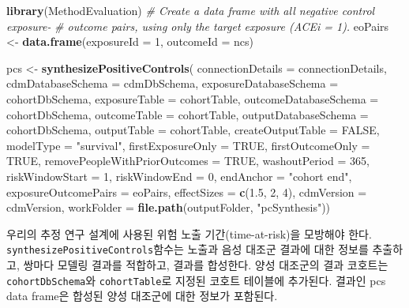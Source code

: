 \documentclass[10.5pt]{book}
\newenvironment{Shaded}{\begin{snugshade}}{\end{snugshade}}
\newcommand{\KeywordTok}[1]{\textcolor[rgb]{0.13,0.29,0.53}{\textbf{#1}}}
\newcommand{\DataTypeTok}[1]{\textcolor[rgb]{0.13,0.29,0.53}{#1}}
\newcommand{\DecValTok}[1]{\textcolor[rgb]{0.00,0.00,0.81}{#1}}
\newcommand{\FloatTok}[1]{\textcolor[rgb]{0.00,0.00,0.81}{#1}}
\newcommand{\StringTok}[1]{\textcolor[rgb]{0.31,0.60,0.02}{#1}}
\newcommand{\CommentTok}[1]{\textcolor[rgb]{0.56,0.35,0.01}{\textit{#1}}}
\newcommand{\OtherTok}[1]{\textcolor[rgb]{0.56,0.35,0.01}{#1}}
\newcommand{\NormalTok}[1]{#1}
\theoremstyle{definition}
\theoremstyle{definition}
\theoremstyle{definition}
\theoremstyle{remark}
\begin{document}
\begin{Shaded}
\begin{Highlighting}[]
\KeywordTok{library}\NormalTok{(MethodEvaluation)}
\CommentTok{# Create a data frame with all negative control exposure-}
\CommentTok{# outcome pairs, using only the target exposure (ACEi = 1).}
\NormalTok{eoPairs <-}\StringTok{ }\KeywordTok{data.frame}\NormalTok{(}\DataTypeTok{exposureId =} \DecValTok{1}\NormalTok{,}
                      \DataTypeTok{outcomeId =}\NormalTok{ ncs)}

\NormalTok{pcs <-}\StringTok{ }\KeywordTok{synthesizePositiveControls}\NormalTok{(}
  \DataTypeTok{connectionDetails =}\NormalTok{ connectionDetails,}
  \DataTypeTok{cdmDatabaseSchema =}\NormalTok{ cdmDbSchema,}
  \DataTypeTok{exposureDatabaseSchema =}\NormalTok{ cohortDbSchema,}
  \DataTypeTok{exposureTable =}\NormalTok{ cohortTable,}
  \DataTypeTok{outcomeDatabaseSchema =}\NormalTok{ cohortDbSchema,}
  \DataTypeTok{outcomeTable =}\NormalTok{ cohortTable,}
  \DataTypeTok{outputDatabaseSchema =}\NormalTok{ cohortDbSchema,}
  \DataTypeTok{outputTable =}\NormalTok{ cohortTable,}
  \DataTypeTok{createOutputTable =} \OtherTok{FALSE}\NormalTok{,}
  \DataTypeTok{modelType =} \StringTok{"survival"}\NormalTok{,}
  \DataTypeTok{firstExposureOnly =} \OtherTok{TRUE}\NormalTok{,}
  \DataTypeTok{firstOutcomeOnly =} \OtherTok{TRUE}\NormalTok{,}
  \DataTypeTok{removePeopleWithPriorOutcomes =} \OtherTok{TRUE}\NormalTok{,}
  \DataTypeTok{washoutPeriod =} \DecValTok{365}\NormalTok{,}
  \DataTypeTok{riskWindowStart =} \DecValTok{1}\NormalTok{,}
  \DataTypeTok{riskWindowEnd =} \DecValTok{0}\NormalTok{,}
  \DataTypeTok{endAnchor =} \StringTok{"cohort end"}\NormalTok{,}
  \DataTypeTok{exposureOutcomePairs =}\NormalTok{ eoPairs,}
  \DataTypeTok{effectSizes =} \KeywordTok{c}\NormalTok{(}\FloatTok{1.5}\NormalTok{, }\DecValTok{2}\NormalTok{, }\DecValTok{4}\NormalTok{),}
  \DataTypeTok{cdmVersion =}\NormalTok{ cdmVersion,}
  \DataTypeTok{workFolder =} \KeywordTok{file.path}\NormalTok{(outputFolder, }\StringTok{"pcSynthesis"}\NormalTok{))}
\end{Highlighting}
\end{Shaded}

우리의 추정 연구 설계에 사용된 위험 노출 기간(time-at-risk)을 모방해야
한다. \texttt{synthesizePositiveControls}함수는 노출과 음성 대조군
결과에 대한 정보를 추출하고, 쌍마다 모델링 결과를 적합하고, 결과를
합성한다. 양성 대조군의 결과 코호트는 \texttt{cohortDbSchema}와
\texttt{cohortTable}로 지정된 코호트 테이블에 추가된다. 결과인 pcs data
frame은 합성된 양성 대조군에 대한 정보가 포함된다.
\end{document}
